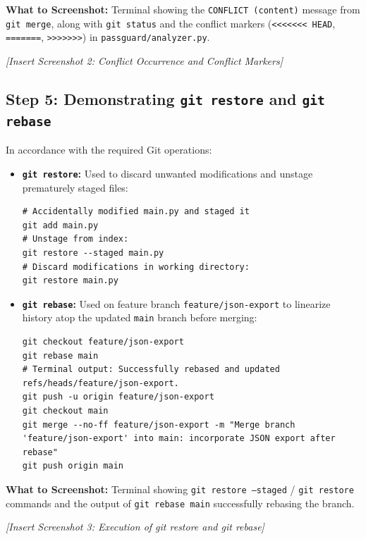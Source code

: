 \documentclass[11pt,a4paper]{article}
\begin{document}
\begin{tcolorbox}[colback=red!4!white,colframe=red!70!black,title=\textbf{Screenshot Placeholder 2: Merge Conflict Error \& Conflict Markers}]
\textbf{What to Screenshot:} Terminal showing the \texttt{CONFLICT (content)} message from \texttt{git merge}, along with \texttt{git status} and the conflict markers (\texttt{<<<<<<< HEAD}, \texttt{=======}, \texttt{>>>>>>>}) in \texttt{passguard/analyzer.py}.
\vspace{2.5cm}
\begin{center}
\textit{[Insert Screenshot 2: Conflict Occurrence and Conflict Markers]}
\end{center}
\end{tcolorbox}

\subsection{Step 5: Demonstrating \texttt{git restore} and \texttt{git rebase}}
In accordance with the required Git operations:
\begin{itemize}
    \item \textbf{\texttt{git restore}:} Used to discard unwanted modifications and unstage prematurely staged files:
\begin{lstlisting}[style=terminal]
# Accidentally modified main.py and staged it
git add main.py
# Unstage from index:
git restore --staged main.py
# Discard modifications in working directory:
git restore main.py
\end{lstlisting}

    \item \textbf{\texttt{git rebase}:} Used on feature branch \texttt{feature/json-export} to linearize history atop the updated \texttt{main} branch before merging:
\begin{lstlisting}[style=terminal]
git checkout feature/json-export
git rebase main
# Terminal output: Successfully rebased and updated refs/heads/feature/json-export.
git push -u origin feature/json-export
git checkout main
git merge --no-ff feature/json-export -m "Merge branch 'feature/json-export' into main: incorporate JSON export after rebase"
git push origin main
\end{lstlisting}
\end{itemize}

\begin{tcolorbox}[colback=purple!4!white,colframe=purple!70!black,title=\textbf{Screenshot Placeholder 3: Demonstrating git restore and git rebase}]
\textbf{What to Screenshot:} Terminal showing \texttt{git restore --staged} / \texttt{git restore} commands and the output of \texttt{git rebase main} successfully rebasing the branch.
\vspace{2.5cm}
\begin{center}
\textit{[Insert Screenshot 3: Execution of git restore and git rebase]}
\end{center}
\end{tcolorbox}
\end{document}
